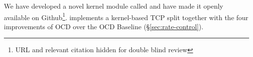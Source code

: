 \label{sec:design}
We have developed a novel kernel module called \textit{\ksplit} %
and have made it openly available on Github\footnote{URL and relevant citation hidden for double blind review}. \ksplit implements a kernel-based TCP split together with the four improvements of OCD \name over the OCD Baseline (\S\ref{sec:rate-control}). 





